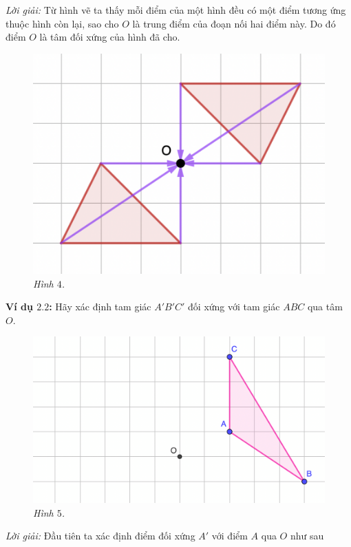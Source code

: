 	\begin{multicols}{2}
	\textit{Lời giải:} Từ hình vẽ ta thấy mỗi điểm của một hình đều có một điểm tương ứng thuộc hình còn lại, sao cho $O$ là trung điểm của đoạn nối hai điểm này. Do đó điểm $O$ là tâm đối xứng của hình đã cho. 
	\begin{figure}[H]
		\vspace*{-5pt}
		\centering
		\captionsetup{labelformat= empty, justification=centering}
		\includegraphics[width= 0.65\linewidth]{4}
		\caption{\small\textit{\color{toancuabi}Hình $4$.}}
		\vspace*{-10pt}
	\end{figure}
	\textbf{\color{toancuabi}Ví dụ $\pmb{2.2}$:} Hãy xác định tam giác $A'B'C'$ đối xứng với tam giác $ABC$ qua tâm $O$.
	\begin{figure}[H]
		\vspace*{-5pt}
		\centering
		\captionsetup{labelformat= empty, justification=centering}
		\includegraphics[width= 1\linewidth]{5}
		\caption{\small\textit{\color{toancuabi}Hình $5$.}}
		\vspace*{-10pt}
	\end{figure}
	\textit{Lời giải:} Đầu tiên ta xác định điểm đối xứng $A'$ với điểm $A$ qua $O$ như sau

\end{multicols}
